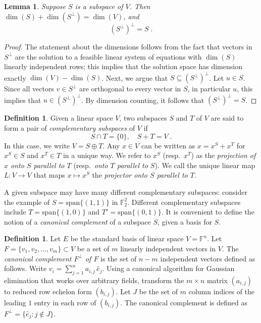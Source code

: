 \documentclass[11pt]{article}
\newtheorem{lemma}[theorem]{Lemma}
\theoremstyle{definition}
\newtheorem{definition}[theorem]{Definition}
\newcommand{\F}{\ensuremath{\mathbb{F}}}
\begin{document}
\begin{lemma}
  \label{lem:perp_perp}
  Suppose $S$ is a subspace of $V$. Then $\dim(S) + \dim(S^\perp) =
  \dim(V)$, and 
  \begin{equation*}
    (S^\perp)^\perp = S\;.
  \end{equation*}
\end{lemma}

\begin{proof}
  The statement about the dimensions follows from the fact that vectors in $S^\perp$ are
  the solution to a feasible linear system of equations with $\dim(S)$ linearly
  independent rows; this implies that the solution space has dimension exactly
  $\dim(V) - \dim(S)$.
  Next, we argue that $S \subseteq (S^\perp)^\perp$.
  Let $u \in S$.
  Since all vectors $v \in S^\perp$ are orthogonal to every vector in $S$,
  in particular $u$, this implies that $u \in (S^\perp)^\perp$.
  By dimension counting, it follows that $(S^\perp)^\perp = S$.
\end{proof}

\begin{definition}\label{def:complementary}
  Given a linear space $V$, two subspaces $S$ and $T$ of $V$ are said to form a
  pair of \emph{complementary subspaces} of $V$ if
\begin{equation*}
  S \cap T = \{ 0 \}, \quad S + T = V\;.
\end{equation*}
In this case, we write $V = S \oplus T$.
Any $x\in V$ can be written as $x = x^S + x^T$ for $x^S \in S$ and $x^T \in T$
in a unique way.
We refer to $x^S$ (resp.~$x^T$) as the \emph{projection of $x$ onto $S$ parallel
  to $T$} (resp.~\emph{onto $T$ parallel to $S$}).
We call the unique linear map $L: V \to V$ that maps $x \mapsto x^S$ the
\emph{projector onto $S$ parallel to $T$}.
\end{definition}

A given subspace may have many different complementary subspaces: consider the
example of $S = \mathrm{span}\{(1,1) \}$ in $\F_2^2$.
Different complementary subspaces include $T = \mathrm{span}\{(1,0)\}$ and
$T' = \mathrm{span}\{(0,1)\}$.
It is convenient to define the notion of a \emph{canonical complement} of a
subspace $S$, given a basis for $S$.

\begin{definition}
  \label{def:canonical-complement}
  Let $E$ be the standard basis of linear space $V = \F^n$.
  Let $F = \{v_1, v_2, \ldots, v_m\} \subset V$ be a set of $m$ linearly
  independent vectors in $V$.
  The \emph{canonical complement $F^\perp$ of $F$} is the set of $n-m$ independent
  vectors defined as follows.
  Write $v_i = \sum_{j=1}^n a_{i, j}\, \hat{e}_j$.
	Using a canonical algorithm for Gaussian elimination that works over arbitrary
  fields, transform the $m\times n$ matrix $(a_{i, j})$ to reduced row echelon
  form $(b_{i, j})$.
  Let $J$ be the set of $m$ column indices of the leading $1$ entry in each row
  of $(b_{i, j})$.
  The canonical complement is defined as $F^\perp = \{ \hat{e}_j : j \not\in J \}$.
\end{definition}
\end{document}
